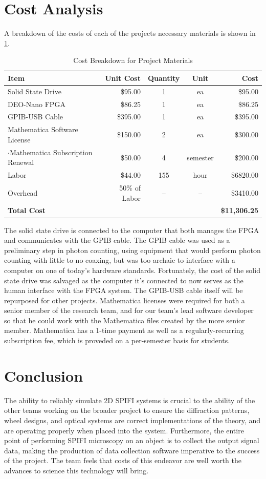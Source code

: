\documentclass[12pt]{article}
\providecommand{\tab}{\hspace{10pt}}
\begin{document}
\section*{Cost Analysis}
A breakdown of the costs of each of the projects necessary materials is shown in \ref{tbl:cost}.
\begin{table}[h]
\centering
\begin{tabular}{l|r|c|c|r}
\bf{Item} & \bf{Unit Cost} & \bf{Quantity} & \bf{Unit} & \bf{Cost}\\
\hline
Solid State Drive 				& \$95.00 	& 1 & ea 	& \$95.00\\
DEO-Nano FPGA 					& \$86.25 	& 1 & ea 	& \$86.25\\
GPIB-USB Cable					& \$395.00	& 1 & ea 	& \$395.00\\
Mathematica Software License			& \$150.00	& 2 & ea 	& \$300.00\\
\tab$\cdot$Mathematica Subscription Renewal	& \$50.00	& 4 & semester	& \$200.00\\
\hline
Labor 						& \$44.00 	&155& hour	& \$6820.00\\
Overhead	 				& 50\% of Labor	& --& -- 	& \$3410.00\\
\hline
\bf{Total Cost} & & & & \bf{\$11,306.25}
\end{tabular}
\caption{Cost Breakdown for Project Materials\label{tbl:cost}}
\end{table}

The solid state drive is connected to the computer that both manages the FPGA and communicates with the GPIB cable. The GPIB cable was used as a preliminary step in photon counting, using equipment that would perform photon counting with little to no coaxing, but was too archaic to interface with a computer on one of today's hardware standards. Fortunately, the cost of the solid state drive was salvaged as the computer it's connected to now serves as the human interface with the FPGA system. The GPIB-USB cable itself will be repurposed for other projects. Mathematica licenses were required for both a senior member of the research team, and for our team's lead software developer so that he could work with the Mathematica files created by the more senior member. Mathematica has a 1-time payment as well as a regularly-recurring subscription fee, which is proveded on a per-semester basis for students.

\section*{Conclusion}
The ability to reliably simulate 2D SPIFI systems is crucial to the ability
of the other teams working on the broader project to ensure the diffraction
patterns, wheel designs, and optical systems are correct implementations of
the theory, and are operating properly when placed into the system.
Furthermore, the entire point of performing SPIFI microscopy on an object
is to collect the output signal data, making the production of data
collection software imperative to the success of the project. The team
feels that costs of this endeavor are
well worth the advances to science this technology will bring.
\end{document}

